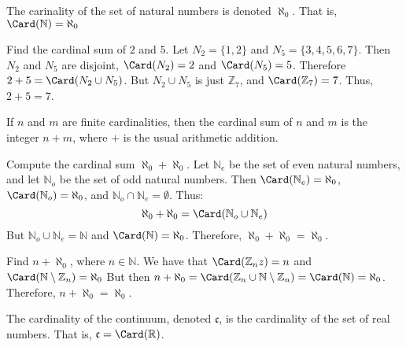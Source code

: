         The carinality of the set of natural numbers is denoted $\aleph_{0}$.
        That is, $\Card(\mathbb{N})=\aleph_{0}$
        \begin{example}
            Find the cardinal sum of $2$ and $5$. Let $N_{2}=\{1,2\}$ and
            $N_{5}=\{3,4,5,6,7\}$. Then $N_{2}$ and $N_{5}$ are disjoint,
            $\Card(N_{2})=2$ and $\Card(N_{5})=5$. Therefore
            $2+5=\Card(N_{2}\cup{N_{5}})$. But ${N_{2}}\cup{N_{5}}$ is just
            $\mathbb{Z}_{7}$, and $\Card(\mathbb{Z}_{7})=7$. Thus, $2+5=7$.
        \end{example}
        \begin{theorem}
            If $n$ and $m$ are finite cardinalities, then the cardinal sum of $n$
            and $m$ is the integer $n+m$, where $+$ is the usual arithmetic
            addition.
        \end{theorem}
        \begin{example}
            Compute the cardinal sum $\aleph_{0}+\aleph_{0}$. Let $\mathbb{N}_{e}$
            be the set of even natural numbers, and let $\mathbb{N}_{o}$ be the set
            of odd natural numbers. Then $\Card(\mathbb{N}_{e})=\aleph_{0}$,
            $\Card(\mathbb{N}_{o})=\aleph_{0}$, and
            ${\mathbb{N}_{o}}\cap{\mathbb{N}_{e}}=\emptyset$. Thus:
            \begin{equation}
                \aleph_{0}+\aleph_{0}=\Card({\mathbb{N}_{o}}\cup{\mathbb{N}_{e}})
            \end{equation}
            But ${\mathbb{N}_{o}}\cup{\mathbb{N}_{e}}=\mathbb{N}$ and
            $\Card(\mathbb{N})=\aleph_{0}$. Therefore,
            $\aleph_{0}+\aleph_{0}=\aleph_{0}$.
        \end{example}
        \begin{example}
            Find $n+\aleph_{0}$, where $n\in\mathbb{N}$. We have that
            $\Card(\mathbb{Z}_{n}z)=n$ and
            $\Card(\mathbb{N}\setminus\mathbb{Z}_{n})=\aleph_{0}$
            But then
            $n+\aleph_{0}=\Card(\mathbb{Z}_{n}\cup%
             \mathbb{N}\setminus\mathbb{Z}_{n})=\Card(\mathbb{N})=\aleph_{0}$.
            Therefore, $n+\aleph_{0}=\aleph_{0}$.
        \end{example}
        \begin{definition}
            The cardinality of the continuum, denoted $\mathfrak{c}$, is the
            cardinality of the set of real numbers. That is,
            $\mathfrak{c}=\Card(\mathbb{R})$.
        \end{definition}
